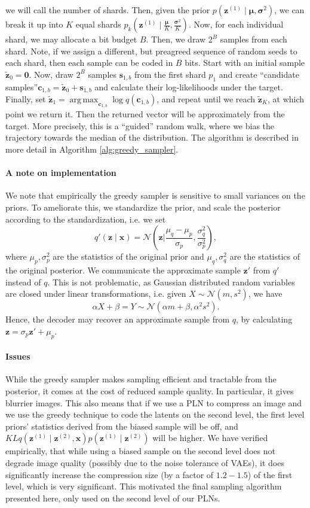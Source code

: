 \documentclass{article}
\renewcommand{\vec}[1]{\mathbf{#1}}
\newcommand{\Norm}[1]{\mathcal{N}\left( #1 \right)}
\newcommand{\MU}{\boldsymbol\mu}
\newcommand{\SIGMA}{\boldsymbol\sigma}
\DeclareMathOperator*{\argmax}{arg\,max}
\begin{document}
we will call the number of shards. Then, given the prior $p(\vec{z}^{(1)} \mid
\MU, \SIGMA^2)$, we can break it up into $K$ equal shards $p_k\left(\vec{z}^{(1)}
\mid \frac{\MU}{K}, \frac{\SIGMA^2}{K}\right)$. Now, for each individual shard,
we may allocate a bit budget $B$. Then, we draw $2^B$ samples from each shard.
Note, if we assign a different, but preagreed sequence of random seeds to each
shard, then each sample can be coded in $B$ bits. Start with an initial sample
$\vec{\tilde{z}}_0 = \vec{0}$. Now, draw $2^B$ samples $\vec{s}_{1, b}$ from the
first shard $p_1$ and create ``candidate samples''$\vec{c}_{1, b} =
\vec{\tilde{z}}_0 + \vec{s}_{1, b}$ and calculate their log-likelihoods under the
target. Finally, set $\vec{\tilde{z}}_1 = \argmax_{\vec{c}_{1, b}}\log
q(\vec{c}_{1, b})$, and repeat until we reach $\vec{\tilde{z}}_K$, at which
point we return it. Then the returned vector will be approximately from the
target. More precisely, this is a ``guided'' random walk, where we bias the
trajectory towards the median of the distribution. The algorithm is described in
more detail in Algorithm \ref{alg:greedy_sampler}.
\paragraph{A note on implementation}
We note that empirically the greedy sampler is sensitive to small variances on
the priors. To ameliorate this, we standardize the prior, and scale the
posterior according to the standardization, i.e. we set 
\[
  q'(\vec{z} \mid \vec{x}) = \Norm{\vec{z} \bigg| \frac{\mu_q -
      \mu_p}{\sigma_p}, \frac{\sigma^2_{q}}{\sigma^2_{p}}},
\]
where $\mu_p, \sigma^2_p$ are the statistics of the original prior and $\mu_q,
\sigma^2_q$ are the statistics of the original posterior. We communicate the
approximate sample $\vec{z}'$ from $q'$ instead of $q$. This is not problematic, as
Gaussian distributed random variables are closed under linear transformations,
i.e. given $X \sim \Norm{m, s^2}$, we have
\[
  \alpha X + \beta = Y \sim \Norm{\alpha m + \beta, \alpha^2 s^2}.
\]
Hence, the decoder may recover an approximate sample from $q$, by calculating
$\vec{z} = \sigma_{p} \vec{z}' + \mu_{p}$.
\paragraph{Issues}
While the greedy sampler makes sampling efficient and tractable from the
posterior, it comes at the cost of reduced sample quality. In particular, it
gives blurrier images. This also means that if we use a PLN to compress an
image and we use the greedy technique to code the latents on the second level,
the first level priors' statistics derived from the biased sample will be off,
and $KL{q(\vec{z}^{(1)} \mid \vec{z}^{(2)}, \vec{x})}{p(\vec{z}^{(1)} \mid
  \vec{z}^{(2)})}$ will be higher. We have verified empirically, that while
using a biased sample on the second level does not degrade image quality
(possibly due to the noise tolerance of VAEs), it does significantly increase
the compression size (by a factor of $1.2 - 1.5$) of the first level, which is
very significant. This motivated the final sampling algorithm presented here,
only used on the second level of our PLNs.
\end{document}
